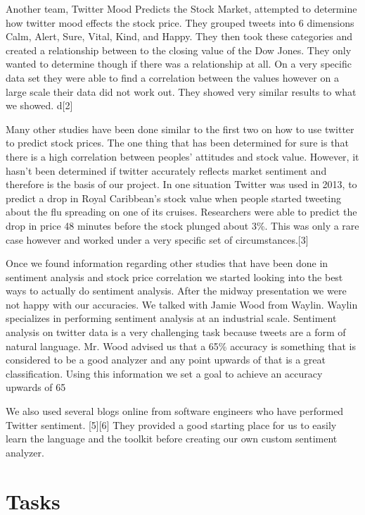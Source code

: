 \documentclass{acm_proc_article-sp}
\begin{document}
Another team, Twitter Mood Predicts the Stock Market, attempted to determine
how twitter mood effects the stock price. They grouped tweets into 6
dimensions Calm, Alert, Sure, Vital, Kind, and Happy. They then took these
categories and created a relationship between to the closing value of the Dow
Jones. They only wanted to determine though if there was a relationship at all. 
On a very specific data set they were able to find a correlation between the values
however on a large scale their data did not work out. They showed very similar
results to what we showed. d[2] 

Many other studies have been done similar to the first two on how to use
twitter to predict stock prices. The one thing that has been determined for
sure is that there is a high correlation between peoples' attitudes and stock
value. However, it hasn't been determined if twitter accurately reflects market
sentiment and therefore is the basis of our project. In one situation Twitter
was used in 2013, to predict a drop in Royal Caribbean's stock value when
people started tweeting about the flu spreading on one of its cruises.
Researchers were able to predict the drop in price 48 minutes before the stock
plunged about 3\%. This was only a rare case however and worked under a very
specific set of circumstances.[3]

Once we found information regarding other studies that have been done in
sentiment analysis and stock price correlation we started looking into the best
ways to actually do sentiment analysis. After the midway presentation we were not happy
with our accuracies. We talked with Jamie Wood from Waylin. Waylin specializes
in performing sentiment analysis at an industrial scale. Sentiment analysis on
twitter data is a very challenging task because tweets are a form of natural
language. Mr. Wood advised us that a 65\% accuracy is something that is
considered to be a good analyzer and any point upwards of that is a great
classification. Using this information we set a goal to achieve an accuracy
upwards of 65%

We also used several blogs online from software engineers who have performed
Twitter sentiment. [5][6] They provided a good starting place for us to easily learn
the language and the toolkit before creating our own custom sentiment analyzer. 

\section{Tasks}
\end{document}
